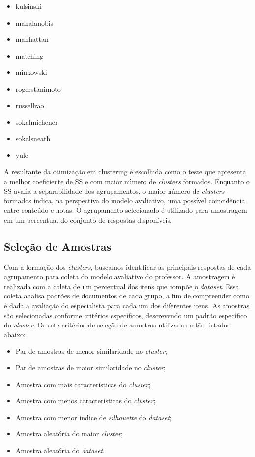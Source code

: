 \begin{minipage}[!h]{0.45\textwidth}
    \begin{itemize}
      \item kulsinski
      \item mahalanobis
      \item manhattan
      \item matching
      \item minkowski
      \item rogerstanimoto
      \item russellrao
      \item sokalmichener
      \item sokalsneath
      \item yule
\end{itemize}

A resultante da otimização em clustering é escolhida como o teste que apresenta a melhor coeficiente de SS e com maior número de \textit{clusters} formados. Enquanto o SS avalia a separabilidade dos agrupamentos, o maior número de \textit{clusters} formados indica, na perspectiva do modelo avaliativo, uma possível coincidência entre conteúdo e notas. O agrupamento selecionado é utilizado para amostragem em um percentual do conjunto de respostas disponíveis. 


\subsection{Seleção de Amostras}

Com a formação dos \textit{clusters}, buscamos identificar as principais respostas de cada agrupamento para coleta do modelo avaliativo do professor. A amostragem é realizada com a coleta de um percentual dos itens que compõe o \textit{dataset}. Essa coleta analisa padrões de documentos de cada grupo, a fim de compreender como é dada a avaliação do especialista para cada um dos diferentes itens. As amostras são selecionadas conforme critérios específicos, descrevendo um padrão específico do \textit{cluster}. Os sete critérios de seleção de amostras utilizados estão listados abaixo:

\begin{itemize}
	\item Par de amostras de menor similaridade no \textit{cluster};
	\item Par de amostras de maior similaridade no \textit{cluster};
	\item Amostra com mais características do \textit{cluster};
	\item Amostra com menos características do \textit{cluster};
	\item Amostra com menor índice de \textit{silhouette} do \textit{dataset};
	\item Amostra aleatória do maior \textit{cluster};
	\item Amostra aleatória do \textit{dataset}.
\end{itemize}


\end{minipage}
